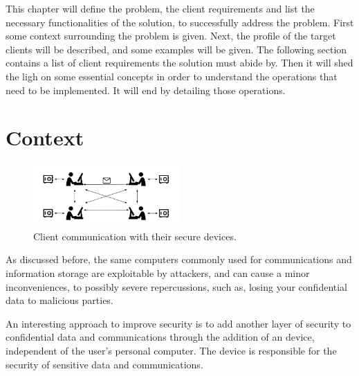 \cleardoublepage
\label{chap:problem}

This chapter will define the problem, the client requirements and list the necessary functionalities of the solution, to successfully address the problem.
First some context surrounding the problem is given. 
Next, the profile of the target clients will be described, and some examples will be given.
The following section contains a list of client requirements the solution must abide by.
Then it will shed the ligh on some essential concepts in order to understand the operations that need to be implemented.
It will end by detailing those operations.

\section{Context} \label{chap:problem:context}

\begin{figure}[h]
    \centering
    \includegraphics[width=0.5\textwidth]{./Images/main-figure.png}
    \caption{Client communication with their secure devices.}
    \label{fig:main-system}
\end{figure}

As discussed before, the same computers commonly used for communications and information storage are exploitable by attackers, and can cause a minor inconveniences, to possibly severe repercussions, such as, losing your confidential data to malicious parties.

An interesting approach to improve security is to add another layer of security to confidential data and communications through the addition of an device, independent of the user's personal computer. The device is responsible for the security of sensitive data and communications.

